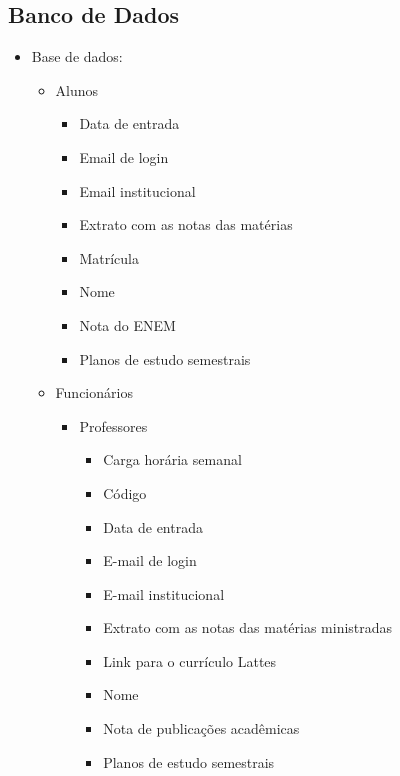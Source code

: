         \subsection{Banco de Dados}
            \begin{itemize}
                \item Base de dados:
                \begin{itemize}
                    \item Alunos
                    \begin{itemize}
                        \item Data de entrada
                        \item Email de login
                        \item Email institucional
                        \item Extrato com as notas das matérias
                        \item Matrícula
                        \item Nome
                        \item Nota do ENEM
                        \item Planos de estudo semestrais
                    \end{itemize}
                    \item Funcionários
                    \begin{itemize}
                        \item Professores
                        \begin{itemize}
                            \item Carga horária semanal
                            \item Código
                            \item Data de entrada
                            \item E-mail de login
                            \item E-mail institucional
                            \item Extrato com as notas das matérias ministradas
                            \item Link para o currículo Lattes
                            \item Nome
                            \item Nota de publicações acadêmicas
                            \item Planos de estudo semestrais

\end{itemize}
\end{itemize}
\end{itemize}
\end{itemize}
